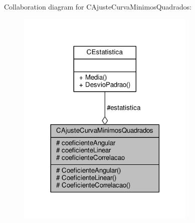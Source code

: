 Collaboration diagram for C\-Ajuste\-Curva\-Minimos\-Quadrados\-:
\nopagebreak
\begin{figure}[H]
\begin{center}
\leavevmode
\includegraphics[width=242pt]{classCAjusteCurvaMinimosQuadrados__coll__graph}
\end{center}
\end{figure}
